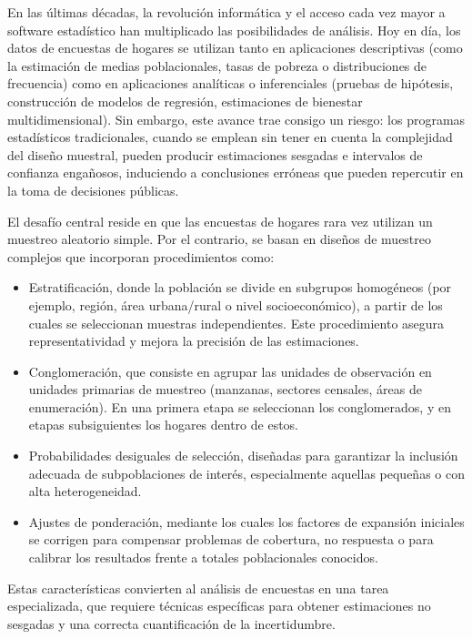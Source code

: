 \documentclass[
  spanish,
  12pt,
]{book}
\providecommand{\tightlist}{%
  \setlength{\itemsep}{0pt}\setlength{\parskip}{0pt}}
\begin{document}
En las últimas décadas, la revolución informática y el acceso cada vez mayor a software estadístico han multiplicado las posibilidades de análisis. Hoy en día, los datos de encuestas de hogares se utilizan tanto en aplicaciones descriptivas (como la estimación de medias poblacionales, tasas de pobreza o distribuciones de frecuencia) como en aplicaciones analíticas o inferenciales (pruebas de hipótesis, construcción de modelos de regresión, estimaciones de bienestar multidimensional). Sin embargo, este avance trae consigo un riesgo: los programas estadísticos tradicionales, cuando se emplean sin tener en cuenta la complejidad del diseño muestral, pueden producir estimaciones sesgadas e intervalos de confianza engañosos, induciendo a conclusiones erróneas que pueden repercutir en la toma de decisiones públicas.

El desafío central reside en que las encuestas de hogares rara vez utilizan un muestreo aleatorio simple. Por el contrario, se basan en diseños de muestreo complejos que incorporan procedimientos como:

\begin{itemize}
\tightlist
\item
  Estratificación, donde la población se divide en subgrupos homogéneos (por ejemplo, región, área urbana/rural o nivel socioeconómico), a partir de los cuales se seleccionan muestras independientes. Este procedimiento asegura representatividad y mejora la precisión de las estimaciones.
\item
  Conglomeración, que consiste en agrupar las unidades de observación en unidades primarias de muestreo (manzanas, sectores censales, áreas de enumeración). En una primera etapa se seleccionan los conglomerados, y en etapas subsiguientes los hogares dentro de estos.
\item
  Probabilidades desiguales de selección, diseñadas para garantizar la inclusión adecuada de subpoblaciones de interés, especialmente aquellas pequeñas o con alta heterogeneidad.
\item
  Ajustes de ponderación, mediante los cuales los factores de expansión iniciales se corrigen para compensar problemas de cobertura, no respuesta o para calibrar los resultados frente a totales poblacionales conocidos.
\end{itemize}

Estas características convierten al análisis de encuestas en una tarea especializada, que requiere técnicas específicas para obtener estimaciones no sesgadas y una correcta cuantificación de la incertidumbre.
\end{document}
